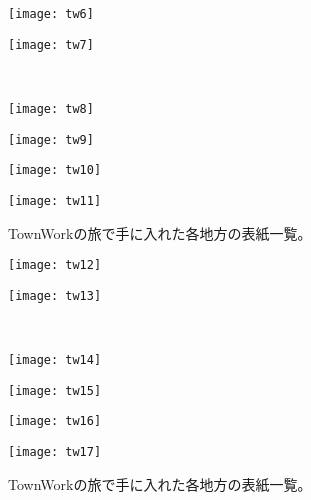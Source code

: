 \newpage
\begin{figure}[htbp]
\vspace{-10mm}
    \centering
  \begin{minipage}{0.4\linewidth}
    \centering
    \texttt{[image: tw6]}
  \end{minipage}
  \begin{minipage}{0.4\linewidth}
    \centering
    \texttt{[image: tw7]}
  \end{minipage}\\
  \begin{minipage}{0.4\linewidth}
    \centering
    \texttt{[image: tw8]}
  \end{minipage}
  \begin{minipage}{0.4\linewidth}
    \centering
    \texttt{[image: tw9]}
  \end{minipage}
  \begin{minipage}{0.4\linewidth}
    \centering
    \texttt{[image: tw10]}
  \end{minipage}
  \begin{minipage}{0.4\linewidth}
    \centering
    \texttt{[image: tw11]}
  \end{minipage}
  \caption{TownWorkの旅で手に入れた各地方の表紙一覧。}
  \label{CscDetaDphi-CSide}
\end{figure}

\newpage
\begin{figure}[htbp]
\vspace{-10mm}
    \centering
  \begin{minipage}{0.4\linewidth}
    \centering
    \texttt{[image: tw12]}
  \end{minipage}
  \begin{minipage}{0.4\linewidth}
    \centering
    \texttt{[image: tw13]}
  \end{minipage}\\
  \begin{minipage}{0.4\linewidth}
    \centering
    \texttt{[image: tw14]}
  \end{minipage}
  \begin{minipage}{0.4\linewidth}
    \centering
    \texttt{[image: tw15]}
  \end{minipage}
  \begin{minipage}{0.4\linewidth}
    \centering
    \texttt{[image: tw16]}
  \end{minipage}
  \begin{minipage}{0.4\linewidth}
    \centering
    \texttt{[image: tw17]}
  \end{minipage}
  \caption{TownWorkの旅で手に入れた各地方の表紙一覧。}
  \label{CscDetaDphi-CSide}
\end{figure}

